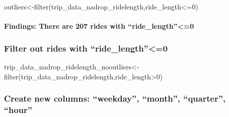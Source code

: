 \documentclass[
]{article}
\newenvironment{Shaded}{\begin{snugshade}}{\end{snugshade}}
\newcommand{\DecValTok}[1]{\textcolor[rgb]{0.00,0.00,0.81}{#1}}
\newcommand{\FunctionTok}[1]{\textcolor[rgb]{0.00,0.00,0.00}{#1}}
\newcommand{\NormalTok}[1]{#1}
\newcommand{\OtherTok}[1]{\textcolor[rgb]{0.56,0.35,0.01}{#1}}
\newcommand{\SpecialCharTok}[1]{\textcolor[rgb]{0.00,0.00,0.00}{#1}}
\newcommand{\StringTok}[1]{\textcolor[rgb]{0.31,0.60,0.02}{#1}}
\begin{document}
\begin{Shaded}
\begin{Highlighting}[]
\NormalTok{outliers}\OtherTok{\textless{}{-}}\FunctionTok{filter}\NormalTok{(trip\_data\_nadrop\_ridelength,ride\_length}\SpecialCharTok{\textless{}=}\DecValTok{0}\NormalTok{)}
\end{Highlighting}
\end{Shaded}

\hypertarget{findings-there-are-207-rides-with-ride_length0}{%
\paragraph{Findings: There are 207 rides with
``ride\_length''\textless=0}\label{findings-there-are-207-rides-with-ride_length0}}

\hypertarget{filter-out-rides-with-ride_length0}{%
\subsubsection{Filter out rides with
``ride\_length''\textless=0}\label{filter-out-rides-with-ride_length0}}

\begin{Shaded}
\begin{Highlighting}[]
\NormalTok{trip\_data\_nadrop\_ridelength\_nooutliers}\OtherTok{\textless{}{-}}\FunctionTok{filter}\NormalTok{(trip\_data\_nadrop\_ridelength,ride\_length}\SpecialCharTok{\textgreater{}}\DecValTok{0}\NormalTok{)}
\end{Highlighting}
\end{Shaded}

\hypertarget{create-new-columns-weekday-month-quarter-hour}{%
\subsubsection{Create new columns: ``weekday'', ``month'', ``quarter'',
``hour''}\label{create-new-columns-weekday-month-quarter-hour}}

\begin{Shaded}
\end{Shaded}
\end{document}
